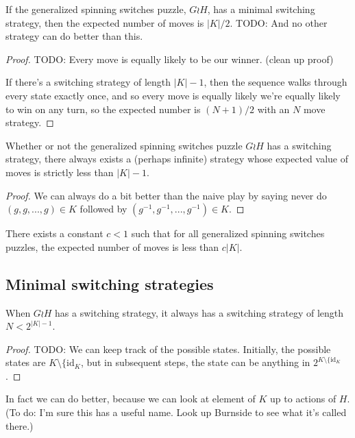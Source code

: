 \begin{proposition}
If the generalized spinning switches puzzle, $G \wr H$, has a minimal switching
strategy, then the expected number of moves is $|K|/2$.
TODO: And no other strategy can do better than this.
\end{proposition}
\begin{proof}
  TODO: Every move is equally likely to be our winner. (clean up proof)

  If there's a switching strategy of length $|K| - 1$,
  then the sequence walks through every state exactly once,
  and so every move is equally likely
  we're equally likely to win on any turn, so
  the expected number is $(N+1)/2$ with an $N$ move strategy.
\end{proof}

\begin{proposition}
  Whether or not the generalized spinning switches puzzle $G \wr H$ has
  a switching strategy, there always exists a (perhaps infinite) strategy
  whose expected value of moves is strictly less than $|K| - 1$.
\end{proposition}
\begin{proof}
  We can always do a bit better than the naive play by saying never do
  $(g,g, ..., g) \in K$ followed by $(g^{-1},g^{-1}, ..., g^{-1}) \in K$.
\end{proof}

\begin{conjecture}
  There exists a constant $c < 1$ such that for all generalized spinning switches
  puzzles, the expected number of moves is less than $c|K|$.
\end{conjecture}

\subsection{Minimal switching strategies}
\begin{proposition}
  When $G \wr H$ has a switching strategy, it always has a switching strategy
  of length $N < 2^{|K|-1}$.
\end{proposition}
\begin{proof}
  TODO: We can keep track of the possible states. Initially, the possible
  states are $K \setminus \{\mathrm{id}_K$, but in subsequent steps, the state
  can be anything in $2^{K \setminus \{\mathrm{id}_K}$.
\end{proof}

In fact we can do better, because we can look at element of $K$ up to actions of
$H$.
(To do: I'm sure this has a useful name. Look up Burnside to see what it's called there.)

